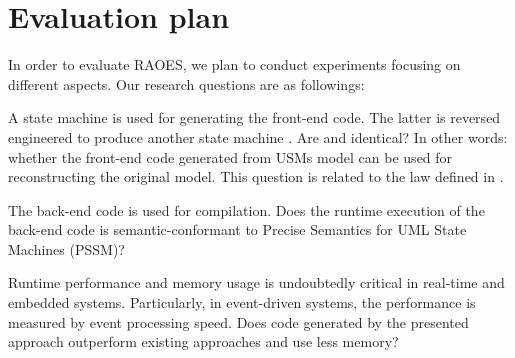 \section{Evaluation plan}
\label{sec:evaluationplan}
In order to evaluate RAOES, we plan to conduct experiments focusing on different aspects. 
Our research questions are as followings:
\begin{description}[\footnotesize]
	\item[\tb{RQ1}] A state machine  is used for generating the front-end code. The latter is reversed engineered to produce another state machine . Are  and  identical? In other words: whether the front-end code generated from USMs model can be used for reconstructing the original model. This question is related to the  law defined in \cite{foster_combinators_2007}.
	
	\item[\tb{RQ2}] The back-end code is used for compilation. 
	Does the runtime execution of the back-end code is semantic-conformant to Precise Semantics for UML State Machines (PSSM)? 
	
	\item[\tb{RQ3}] Runtime performance and memory usage is undoubtedly critical in real-time and embedded systems. Particularly, in event-driven systems, the performance is measured by event processing speed. Does code generated by the presented approach outperform existing approaches and use less memory?
\end{description} 